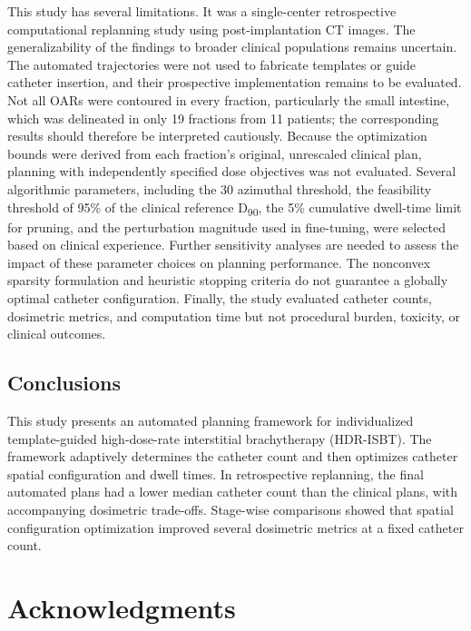 \documentclass[12pt,twoside,letterpaper]{article}
\newcounter{algorithm}
\begin{document}
This study has several limitations. It was a single-center retrospective computational replanning study using post-implantation CT images. The generalizability of the findings to broader clinical populations remains uncertain. The automated trajectories were not used to fabricate templates or guide catheter insertion, and their prospective implementation remains to be evaluated. Not all OARs were contoured in every fraction, particularly the small intestine, which was delineated in only 19 fractions from 11 patients; the corresponding results should therefore be interpreted cautiously. Because the optimization bounds were derived from each fraction's original, unrescaled clinical plan, planning with independently specified dose objectives was not evaluated. Several algorithmic parameters, including the 30\textdegree{} azimuthal threshold, the feasibility threshold of 95\% of the clinical reference D\textsubscript{90}, the 5\% cumulative dwell-time limit for pruning, and the perturbation magnitude used in fine-tuning, were selected based on clinical experience. Further sensitivity analyses are needed to assess the impact of these parameter choices on planning performance. The nonconvex sparsity formulation and heuristic stopping criteria do not guarantee a globally optimal catheter configuration. Finally, the study evaluated catheter counts, dosimetric metrics, and computation time but not procedural burden, toxicity, or clinical outcomes.

\FloatBarrier
\begin{samepage}
\section{Conclusions}\label{sec:5}

This study presents an automated planning framework for individualized template-guided high-dose-rate interstitial brachytherapy (HDR-ISBT). The framework adaptively determines the catheter count and then optimizes catheter spatial configuration and dwell times. In retrospective replanning, the final automated plans had a lower median catheter count than the clinical plans, with accompanying dosimetric trade-offs. Stage-wise comparisons showed that spatial configuration optimization improved several dosimetric metrics at a fixed catheter count.

\end{samepage}

\section*{Acknowledgments}
\end{document}
